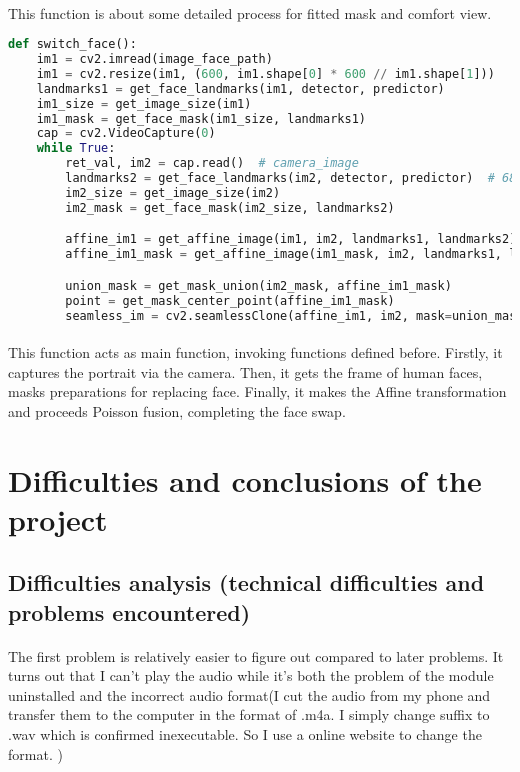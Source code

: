 \documentclass{article}
\begin{document}
		\paragraph{}This function is about some detailed process for  fitted mask and comfort view. 
		\begin{lstlisting}[language=Python]
def switch_face():
    im1 = cv2.imread(image_face_path)
    im1 = cv2.resize(im1, (600, im1.shape[0] * 600 // im1.shape[1]))
    landmarks1 = get_face_landmarks(im1, detector, predictor)
    im1_size = get_image_size(im1)
    im1_mask = get_face_mask(im1_size, landmarks1)
    cap = cv2.VideoCapture(0)
    while True:
        ret_val, im2 = cap.read()  # camera_image
        landmarks2 = get_face_landmarks(im2, detector, predictor)  # 68_face_landmarks
        im2_size = get_image_size(im2)
        im2_mask = get_face_mask(im2_size, landmarks2)

        affine_im1 = get_affine_image(im1, im2, landmarks1, landmarks2)
        affine_im1_mask = get_affine_image(im1_mask, im2, landmarks1, landmarks2)

        union_mask = get_mask_union(im2_mask, affine_im1_mask)
        point = get_mask_center_point(affine_im1_mask)
        seamless_im = cv2.seamlessClone(affine_im1, im2, mask=union_mask, p=point, flags=cv2.NORMAL_CLONE)
		\end{lstlisting}
		\paragraph{}This function acts as main function, invoking functions defined before. Firstly, it captures the portrait via the camera. Then, it gets the frame of human faces, masks preparations for replacing face. Finally, it makes the Affine transformation and proceeds Poisson fusion, completing the face swap.
	\section{Difficulties and conclusions of the project}
   	\subsection{Difficulties analysis (technical difficulties and problems encountered)}
		\paragraph{}The first problem is relatively easier to figure out compared to later problems. It turns out that I can't play the audio while it's both the problem of the module uninstalled and the incorrect audio format(I cut the audio from my phone and transfer them to the computer in the format of .m4a. I simply change suffix to .wav which is confirmed inexecutable. So I use a online website to change the format. )
\end{document}
